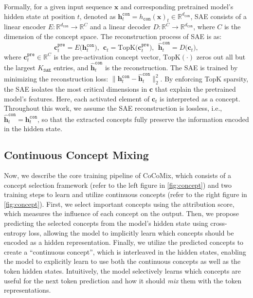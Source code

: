 \documentclass[]{fairmeta}
\def\rvc{{\mathbf{c}}}
\def\rvh{{\mathbf{h}}}
\def\rvx{{\mathbf{x}}}
\newcommand{\mmname}{Continuous Concept Mixing\xspace}
\newcommand{\sname}{CoCoMix\xspace}
\begin{document}
Formally, for a given input sequence $\rvx$ and corresponding pretrained model's hidden state at position $t$, denoted as $\rvh_t^{\mathtt{con}}=h_\mathtt{con}(\rvx)_t \in \mathbb{R}^{d_\mathtt{con}}$, SAE consists of a linear encoder $E: \mathbb{R}^{d_{\mathtt{con}}} \to \mathbb{R}^{C}$ and a linear decoder $D:\mathbb{R}^{C} \to \mathbb{R}^{d_\mathtt{con}}$, where $C$ is the dimension of the concept space. The reconstruction process of SAE is as:
\begin{equation*}
    \rvc_t^{\mathtt{pre}} = E\bigl(\rvh_t^\mathtt{con}\bigr), 
    ~~
    \rvc_t = \mathrm{TopK}\bigl(\rvc_t^{\mathtt{pre}}\bigr),
    ~~
    \widehat{\rvh}_t^\mathtt{con} = D\bigl(\rvc_t\bigr),
\end{equation*}
where $\rvc_t^{\mathtt{pre}}\in\mathbb{R}^{C}$ is the pre-activation concept vector, $\mathrm{TopK}(\cdot)$ zeros out all but the largest \(K_{\mathtt{SAE}}\) entries, and $\widehat{\rvh}_t^\mathtt{con}$ is the reconstruction. The SAE is trained by minimizing the reconstruction loss: $\lVert \rvh_t^\mathtt{con} - \widehat{\rvh}_t^\mathtt{con}\rVert_{2}^2$. By enforcing TopK sparsity, the SAE isolates the most critical dimensions in $\rvc$ that explain the pretrained model’s features. Here, each activated element of $\rvc_t$ is interpreted as a concept. Throughout this work, we assume the SAE reconstruction is lossless, i.e., $\widehat{\rvh}_t^{\mathtt{con}} = \rvh_t^{\mathtt{con}}$, so that the extracted concepts fully preserve the information encoded in the hidden state.


\subsection{\mmname}
\label{sec:method_cocomix}

Now, we describe the core training pipeline of \sname, which consists of a concept selection framework (refer to the left figure in \autoref{fig:concept}) and two training steps to learn and utilize continuous concepts (refer to the right figure in \autoref{fig:concept}). First, we select important concepts using the attribution score, which measures the influence of each concept on the output. Then, we propose predicting the selected concepts from the model's hidden state using cross-entropy loss, allowing the model to implicitly learn which concepts should be encoded as a hidden representation. Finally, we utilize the predicted concepts to create a ``continuous concept'', which is interleaved in the hidden states, enabling the model to explicitly learn to use both the continuous concepts as well as the token hidden states. Intuitively, the model selectively learns which concepts are useful for the next token prediction and how it should \emph{mix} them with the token representations.
\end{document}
